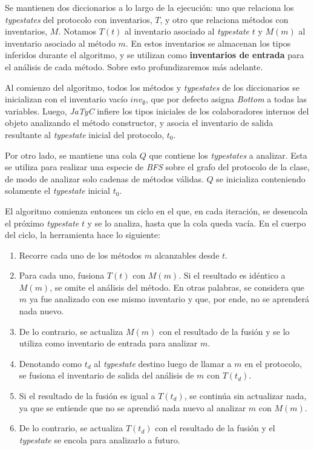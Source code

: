 Se mantienen dos diccionarios a lo largo de la ejecución: uno que relaciona los \textit{typestates} del protocolo con inventarios, $T$, y otro que relaciona métodos con inventarios, $M$. Notamos $T(t)$ al inventario asociado al \textit{typestate} $t$ y $M(m)$ al inventario asociado al método $m$. En estos inventarios se almacenan los tipos inferidos durante el algoritmo, y se utilizan como \textbf{inventarios de entrada} para el análisis de cada método. Sobre esto profundizaremos más adelante.

Al comienzo del algoritmo, todos los métodos y \textit{typestates} de los diccionarios se inicializan con el inventario vacío $\mathit{inv}_{\emptyset}$, que por defecto asigna \textit{Bottom} a todas las variables. Luego, \textit{JaTyC} infiere los tipos iniciales de los colaboradores internos del objeto analizando el método constructor, y asocia el inventario de salida resultante al \textit{typestate} inicial del protocolo, $t_0$.

Por otro lado, se mantiene una cola $Q$ que contiene los \textit{typestates} a analizar. Esta se utiliza para realizar una especie de \textit{BFS} sobre el grafo del protocolo de la clase, de modo de analizar solo cadenas de métodos válidas. $Q$ se inicializa conteniendo solamente el \textit{typestate} inicial $t_0$.

El algoritmo comienza entonces un ciclo en el que, en cada iteración, se desencola el próximo \textit{typestate} $t$ y se lo analiza, hasta que la cola queda vacía. En el cuerpo del ciclo, la herramienta hace lo siguiente:

\begin{enumerate}
    \item Recorre cada uno de los métodos $m$ alcanzables desde $t$.
    \item Para cada uno, fusiona $T(t)$ con $M(m)$. Si el resultado es idéntico a $M(m)$, se omite el análisis del método. En otras palabras, se considera que $m$ ya fue analizado con ese mismo inventario y que, por ende, no se aprenderá nada nuevo.
    \item De lo contrario, se actualiza $M(m)$ con el resultado de la fusión y se lo utiliza como inventario de entrada para analizar $m$.
    \item Denotando como $t_d$ al \textit{typestate} destino luego de llamar a $m$ en el protocolo, se fusiona el inventario de salida del análisis de $m$ con $T(t_d)$.
    \item Si el resultado de la fusión es igual a $T(t_d)$, se continúa sin actualizar nada, ya que se entiende que no se aprendió nada nuevo al analizar $m$ con $M(m)$.
    \item De lo contrario, se actualiza $T(t_d)$ con el resultado de la fusión y el \textit{typestate} se encola para analizarlo a futuro.
\end{enumerate}

